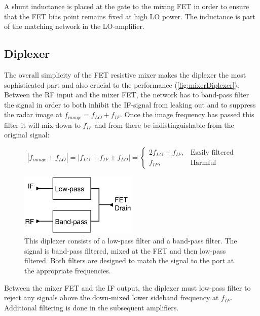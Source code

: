 			 A shunt inductance is placed at the gate to the mixing FET in order to ensure that the FET bias point remains fixed at high LO power. The inductance is part of the matching network in the LO-amplifier.

		\subsection{Diplexer}
			The overall simplicity of the FET resistive mixer makes the diplexer the most sophisticated part and also crucial to the performance (\autoref{fig:mixerDiplexer}). Between the RF input and the mixer FET, the network has to band-pass filter the signal in order to both inhibit the IF-signal from leaking out and to suppress the radar image at $f_{image}=f_{LO}+f_{IF}$. Once the image frequency has passed this filter it will mix down to $f_{IF}$ and from there be indistinguishable from the original signal:

			\begin{equation}
				|f_{image}\pm f_{LO}| = |f_{LO}+f_{IF}\pm f_{LO}| = \left \{
				\begin{array}{ll}
					2f_{LO}+f_{IF}, & \text{Easily filtered} \\
					f_{IF},	& \text{Harmful}
				\end{array}
				\right.
			\end{equation}

			\begin{figure}[hbt!]
				\centering
				\includegraphics[width=0.5\textwidth]{fig/mixer/diplexer}
				\caption[Mixer diplexer signal path]{This diplexer consists of a low-pass filter and a band-pass filter. The signal is band-pass filtered, mixed at the FET and then low-pass filtered. Both filters are designed to match the signal to the port at the appropriate frequencies.}\label{fig:mixerDiplexer}
			\end{figure}

			Between the mixer FET and the IF output, the diplexer must low-pass filter to reject any signals above the down-mixed lower sideband frequency at $f_{IF}$. Additional filtering is done in the subsequent amplifiers.

